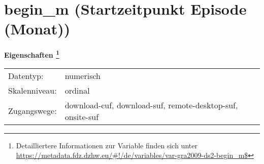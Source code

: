 
    \setcounter{footnote}{0}

    \vspace*{-1.8cm}
	\section{begin\_m (Startzeitpunkt Episode (Monat))}
	\label{section:begin_m}



    \vspace*{0.5cm}
    \noindent\textbf{Eigenschaften
	\footnote{Detailliertere Informationen zur Variable finden sich unter
		\url{https://metadata.fdz.dzhw.eu/\#!/de/variables/var-gra2009-ds2-begin_m$}}}\\
	\begin{tabularx}{\hsize}{@{}lX}
	Datentyp: & numerisch \\
	Skalenniveau: & ordinal \\
	Zugangswege: &
	  download-cuf, 
	  download-suf, 
	  remote-desktop-suf, 
	  onsite-suf
 \\
    \end{tabularx}



